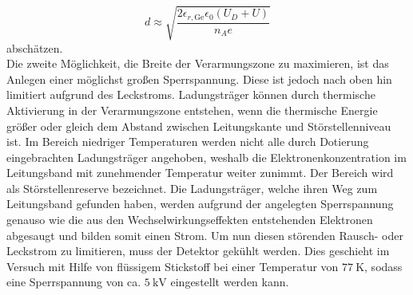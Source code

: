 \begin{equation}
  d \approx \sqrt{\frac{2\epsilon_{r,\text{Ge}}\epsilon_0 ( U_D + U)}{n_A e}}
  \label{eq:dicke}
\end{equation}
abschätzen.\\
Die zweite Möglichkeit, die Breite der Verarmungszone zu maximieren, ist das Anlegen einer möglichst großen Sperrspannung. Diese ist jedoch nach oben hin limitiert aufgrund des Leckstroms. Ladungsträger können durch thermische Aktivierung in der Verarmungszone entstehen, wenn die thermische Energie größer oder gleich dem Abstand zwischen Leitungskante und Störstellenniveau ist. Im Bereich niedriger Temperaturen werden nicht alle durch Dotierung eingebrachten Ladungsträger angehoben, weshalb die Elektronenkonzentration im Leitungsband mit zunehmender Temperatur weiter zunimmt. Der Bereich wird als Störstellenreserve bezeichnet. Die Ladungsträger, welche ihren Weg zum Leitungsband gefunden haben, werden aufgrund der angelegten Sperrspannung genauso wie die aus den Wechselwirkungseffekten entstehenden Elektronen abgesaugt und bilden somit einen Strom. Um nun diesen störenden Rausch- oder Leckstrom zu limitieren, muss der Detektor gekühlt werden. Dies geschieht im Versuch mit Hilfe von flüssigem Stickstoff bei einer Temperatur von $\SI{77}{\kelvin}$, sodass eine Sperrspannung von ca. $\SI{5}{\kilo\volt}$ eingestellt werden kann.

